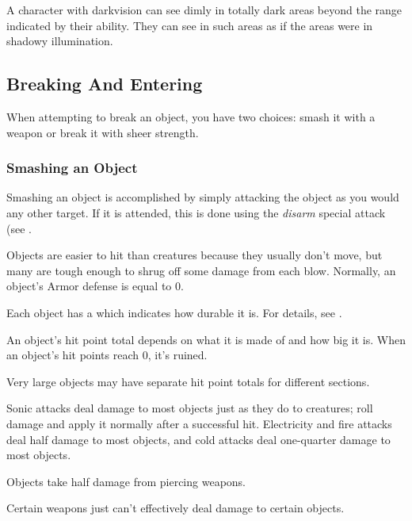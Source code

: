         A character with darkvision can see dimly in totally dark areas beyond the range indicated by their ability. They can see in such areas as if the areas were in shadowy illumination.

    \subsection{Breaking And Entering}
        When attempting to break an object, you have two choices: smash it with a weapon or break it with sheer strength.

        \subsubsection{Smashing an Object}
            Smashing an object is accomplished by simply attacking the object as you would any other target. If it is attended, this is done using the \textit{disarm} special attack (see .

             Objects are easier to hit than creatures because they usually don't move, but many are tough enough to shrug off some damage from each blow.
            Normally, an object's Armor defense is equal to 0.

             Each object has a  which indicates how durable it is.
            For details, see .

             An object's hit point total depends on what it is made of and how big it is. When an object's hit points reach 0, it's ruined.

            Very large objects may have separate hit point totals for different sections.

             Sonic attacks deal damage to most objects just as they do to creatures; roll damage and apply it normally after a successful hit. Electricity and fire attacks deal half damage to most objects, and cold attacks deal one-quarter damage to most objects.

             Objects take half damage from piercing weapons.

             Certain weapons just can't effectively deal damage to certain objects.

